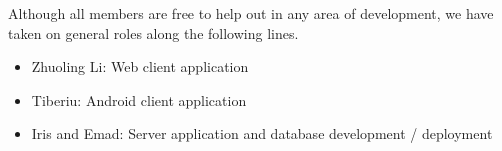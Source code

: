 Although all members are free to help out in any area of development, we have taken on general roles along the following lines.

\begin{itemize}
\item Zhuoling Li: Web client application
\item Tiberiu: Android client application
\item Iris and Emad: Server application and database development / deployment
\end{itemize}